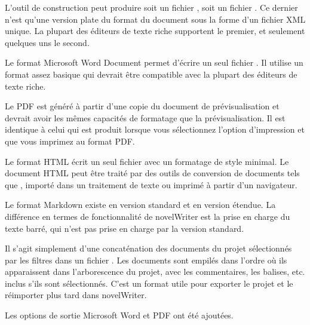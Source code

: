 \documentclass[a4paper,11pt,french]{sphinxmanual}
\begin{document}
\begin{description}
\sphinxAtStartPar
L’outil de construction peut produire soit un fichier , soit un fichier . Ce dernier n’est qu’une version plate du format du document sous la forme d’un fichier XML unique. La plupart des éditeurs de texte riche supportent le premier, et seulement quelques uns le second.

\sphinxAtStartPar
Le format Microsoft Word Document permet d’écrire un seul fichier . Il utilise un format assez basique qui devrait être compatible avec la plupart des éditeurs de texte riche.

\sphinxAtStartPar
Le PDF est généré à partir d’une copie du document de prévisualisation et devrait avoir les mêmes capacités de formatage que la prévisualisation. Il est identique à celui qui est produit lorsque vous sélectionnez l’option d’impression et que vous imprimez au format PDF.

\sphinxAtStartPar
Le format HTML écrit un seul fichier  avec un formatage de style minimal. Le document HTML peut être traité par des outils de conversion de documents tels que , importé dans un traitement de texte ou imprimé à partir d’un navigateur.

\sphinxAtStartPar
Le format Markdown existe en version standard et en version étendue. La  différence en termes de fonctionnalité de novelWriter est la prise en charge du texte barré, qui n’est pas prise en charge par la version standard.

\sphinxAtStartPar
Il s’agit simplement d’une concaténation des documents du projet sélectionnés par les filtres dans un fichier . Les documents sont empilés dans l’ordre où ils apparaissent dans l’arborescence du projet, avec les commentaires, les balises, etc. inclus s’ils sont sélectionnés. C’est un format utile pour exporter le projet et le réimporter plus tard dans novelWriter.

\end{description}

\sphinxAtStartPar
{}Les options de sortie Microsoft Word et PDF ont été ajoutées.
\end{document}
